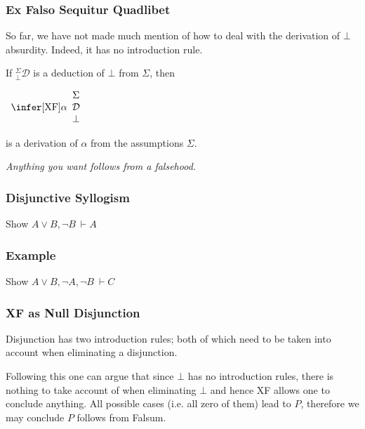 \documentclass{beamer}
\begin{document}
\begin{frame}
	\frametitle{Ex Falso Sequitur Quadlibet}
	
	So far, we have not made much mention of how to deal with the derivation of $\bot$ absurdity. Indeed, it has no introduction rule. 
	
	\vspace{5mm}
		
	If $^{\Sigma}_{\bot}\mathcal{D}$ is a deduction of $\bot$ from $\Sigma$, then
	
	\begin{center}		
		$\begin{array}{c}		
		\infer[\text{XF}]{\alpha}
		{\begin{array}{c} \Sigma \\ \mathcal{D} \\ \bot \end{array}}
		\end{array}$
	\end{center}

	is a derivation of $\alpha$ from the assumptions $\Sigma$.
	
	\vspace{5mm}
	
	\emph{Anything you want follows from a falsehood.} %
	 
\end{frame}

\begin{frame}
	\frametitle{Disjunctive Syllogism}
	
	Show $A \lor B, \lnot B \ \vdash A$
	\vspace{70mm}
	
\end{frame}

\begin{frame}
	\frametitle{Example}
	
	Show $A \lor B, \lnot A, \lnot B \ \vdash C$
	\vspace{70mm}
	
\end{frame}


\begin{frame}
	\frametitle{XF as Null Disjunction}

	Disjunction has two introduction rules; both of which need to be taken into account when eliminating a disjunction. 

	Following this one can argue that since $\bot$ has no introduction rules, there is nothing to take account of when eliminating $\bot$ and hence XF allows one to conclude anything. All possible cases (i.e. all zero of them) lead to $P$, therefore we may conclude $P$ follows from Falsum. 

	\vspace{30mm}

\end{frame}
\end{document}

